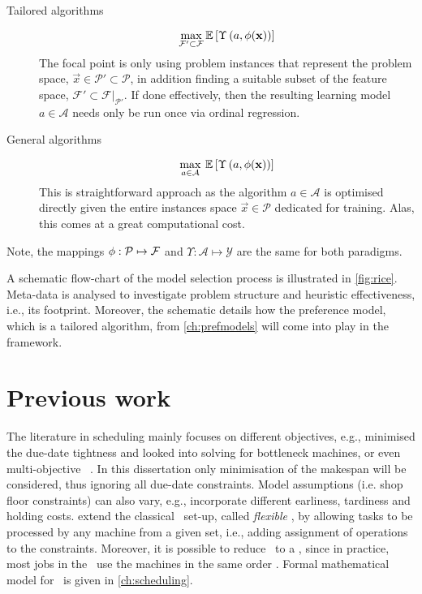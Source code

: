 \begin{description}
  \item[Tailored algorithms] 
  \begin{equation}
    \max_{\mathcal{F}'\subset\mathcal{F}} 
    {\mathbb E}\left[\Upsilon\left(a,{\mathbf{\phi}}(\mathbf{x})\right)\right]
  \end{equation}
  The  focal point is only using  problem instances that represent the problem 
  space, $\vec{x}\in\mathcal{P'}\subset\mathcal{P}$, in addition finding a 
  suitable subset of the feature space, 
  $\mathcal{F}'\subset\mathcal{F}|_{\mathcal{P}'}$. If done effectively, then 
  the resulting learning model $a\in\mathcal{A}$ needs only be run once via 
  ordinal regression.
  \item[General algorithms]
  \begin{equation}
    \max_{a\in\mathcal{A}}\:{\mathbb E}\left[\Upsilon\left(a,{\mathbf{\phi}}(\mathbf{x})\right)\right]
  \end{equation}
  This is  straightforward  approach as the algorithm $a\in\mathcal{A}$ is 
  optimised directly given the entire instances space $\vec{x}\in\mathcal{P}$ 
  dedicated for training. Alas, this comes at a great computational cost.
\end{description}
Note, the mappings ${\mathbf{\phi}}:\mathcal{P}\mapsto\mathcal{F}$ and 
$\Upsilon:\mathcal{A}\mapsto\mathcal{Y}$ are the same for both paradigms.

A schematic flow-chart of the model selection process is illustrated in 
\cref{fig:rice}. 
Meta-data is analysed to investigate problem structure and heuristic 
effectiveness, i.e., its footprint.
Moreover, the schematic details how the preference model, which is a tailored 
algorithm, from \cref{ch:prefmodels} will come into play in the framework.



\section{Previous work}
The literature in scheduling mainly focuses on different objectives, 
e.g., \citet{Chang96} minimised the due-date tightness and 
\citet{Drobouchevitch2000,Gao2007} looked into solving for bottleneck machines, 
or even multi-objective \JSP\ \citep{Vazquez-Rodriguez09,Xia2005,Tay08}.
In this dissertation only minimisation of the makespan will be considered, thus 
ignoring all due-date constraints. 
Model assumptions (i.e. shop floor constraints) can also vary, e.g., 
\citet{Thiagarajan05} incorporate different earliness, tardiness and holding 
costs. 
\citet{Brandimarte1993,Xia2005,Pezzella2008} extend the classical \JSP\ set-up, 
called \emph{flexible} \jsp, by allowing tasks to be processed by any machine 
from a given set, i.e., adding assignment of operations to the constraints.
Moreover, it is possible to reduce \JSP\ to a \FSP, since in practice, 
most jobs in the \jsp\ use the machines in the same order 
\citep{Guinet1998,Ho2007}. 
Formal mathematical model for \JSP\ is given in \cref{ch:scheduling}.

